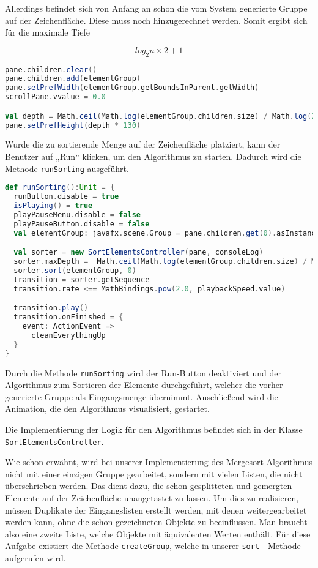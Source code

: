 Allerdings befindet sich von Anfang an schon die vom System generierte Gruppe auf der Zeichenfläche. Diese muss noch hinzugerechnet werden. Somit ergibt sich für die maximale Tiefe

$$log_2 n \times 2 + 1$$

\begin{lstlisting}[language=Scala]
pane.children.clear()
pane.children.add(elementGroup)
pane.setPrefWidth(elementGroup.getBoundsInParent.getWidth)
scrollPane.vvalue = 0.0

val depth = Math.ceil(Math.log(elementGroup.children.size) / Math.log(2)) * 2 + 1
pane.setPrefHeight(depth * 130)
\end{lstlisting}

Wurde die zu sortierende Menge auf der Zeichenfläche platziert, kann der Benutzer auf „Run“ klicken, um den Algorithmus zu starten. Dadurch wird die Methode \texttt{runSorting} ausgeführt.

\begin{lstlisting}[language=Scala,caption=runSorting startet die Sortierung mit anschließender Animationen]
def runSorting():Unit = {
  runButton.disable = true
  isPlaying() = true
  playPauseMenu.disable = false
  playPauseButton.disable = false
  val elementGroup: javafx.scene.Group = pane.children.get(0).asInstanceOf[javafx.scene.Group]

  val sorter = new SortElementsController(pane, consoleLog)
  sorter.maxDepth =  Math.ceil(Math.log(elementGroup.children.size) / Math.log(2)) * 2 + 1
  sorter.sort(elementGroup, 0)
  transition = sorter.getSequence
  transition.rate <== MathBindings.pow(2.0, playbackSpeed.value)

  transition.play()
  transition.onFinished = {
    event: ActionEvent =>
      cleanEverythingUp
  }
}
\end{lstlisting}

Durch die Methode \texttt{runSorting} wird der Run-Button deaktiviert und der Algorithmus zum Sortieren der Elemente durchgeführt, welcher die vorher generierte Gruppe als Eingangsmenge übernimmt. Anschließend wird die Animation, die den Algorithmus visualisiert, gestartet.

Die Implementierung der Logik für den Algorithmus befindet sich in der Klasse \texttt{SortElementsController}.

Wie schon erwähnt, wird bei unserer Implementierung des Mergesort-Algorithmus nicht mit einer einzigen Gruppe gearbeitet, sondern mit vielen Listen, die nicht überschrieben werden. Das dient dazu, die schon gesplitteten und gemergten Elemente auf der Zeichenfläche unangetastet zu lassen. Um dies zu realisieren, müssen Duplikate der Eingangslisten erstellt werden, mit denen weitergearbeitet werden kann, ohne die schon gezeichneten Objekte zu beeinflussen. Man braucht also eine zweite Liste, welche Objekte mit äquivalenten Werten enthält. Für diese Aufgabe existiert die Methode \texttt{createGroup}, welche in unserer \texttt{sort} - Methode aufgerufen wird.

